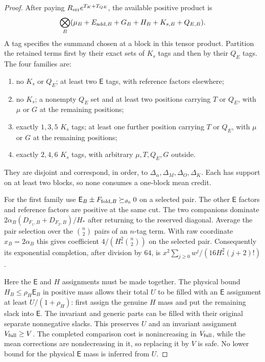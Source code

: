 \begin{proof}
After paying $R_{\rm err}e^{T_K+T_{QE}}$, the available positive product is
\[
 \bigotimes_B(\mu_B+E_{{\rm add},B}+G_B+H_B+K_{s,B}+Q_{E,B}).
\]
A tag specifies the summand chosen at a block in this tensor product.
Partition the retained terms first by their exact sets of $K_s$ tags
and then by their $Q_E$ tags. The four families are:
\begin{enumerate}[label=(\roman*)]
\item no $K_s$ or $Q_E$; at least two $\mathsf E$ tags, with reference
factors elsewhere;
\item no $K_s$; a nonempty $Q_E$ set and at least two positions carrying
$T$ or $Q_E$, with $\mu$ or $G$ at the remaining positions;
\item exactly $1,3,5$ $K_s$ tags; at least one further position carrying
$T$ or $Q_E$, with $\mu$ or $G$ at the remaining positions;
\item exactly $2,4,6$ $K_s$ tags, with arbitrary $\mu,T,Q_E,G$ outside.
\end{enumerate}
They are disjoint and correspond, in order, to
$\Delta_\alpha,\Delta_M,\Delta_O,\Delta_K$.
Each has support on at least two blocks, so none consumes a one-block
mean credit.

For the first family use
$\mathsf E_B\pm F_{{\rm fold},B}\succeq_{\vartheta_0}0$ on a selected pair.
The other $\mathsf E$ factors and reference factors are positive at
the same cut. The two companions dominate
$2\alpha_B(D_{F_1,B}+D_{F_2,B})/H_*$ after returning to the reserved
diagonal. Average the pair selection over the $\binom n2$ pairs of
an $n$-tag term. With raw coordinate $x_B=2\alpha_B$ this gives
coefficient $4/(H_*^2\binom n2)$ on the selected pair.
Consequently its exponential completion, after division by $64$, is
$x^2\sum_{j\ge0}w^j/(16H_*^2(j+2)!)$.

Here the $\mathsf E$ and $H$ assignments must be made together.
The physical bound $H_B\le\rho_H\mathsf E_B$ in positive mass allows
their total $U$ to be filled with an $\mathsf E$ assignment at least
$U/(1+\rho_H)$: first assign the genuine $H$ mass and put the remaining
slack into $\mathsf E$. The invariant and generic parts can be filled
with their original separate nonnegative slacks. This preserves $U$
and an invariant assignment $V_{\rm full}\ge V$. The completed
comparison cost is nonincreasing in $V_{\rm full}$, while the mean
corrections are nondecreasing in it, so replacing it by $V$ is safe.
No lower bound for the physical $\mathsf E$ mass is inferred from $U$.


\end{proof}
